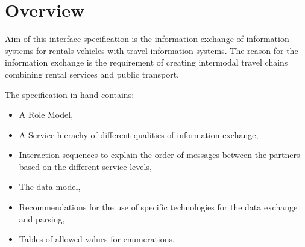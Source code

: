 \chapter{Overview}
\label{cha:Zusammenfassung}

Aim of this interface specification is the information exchange of information systems for rentals vehicles with travel information systems.
The reason for the information exchange is the requirement of creating intermodal travel chains combining rental services and public transport.


The specification in-hand contains:\begin{itemize}
\item A Role Model,
\item A Service hierachy of different qualities of information exchange,
\item Interaction sequences to explain the order of messages between the partners based on the different service levels,
\item The data model,
\item Recommendations for the use of specific technologies for the data exchange and parsing,
\item Tables of allowed values for enumerations.
\end{itemize}
